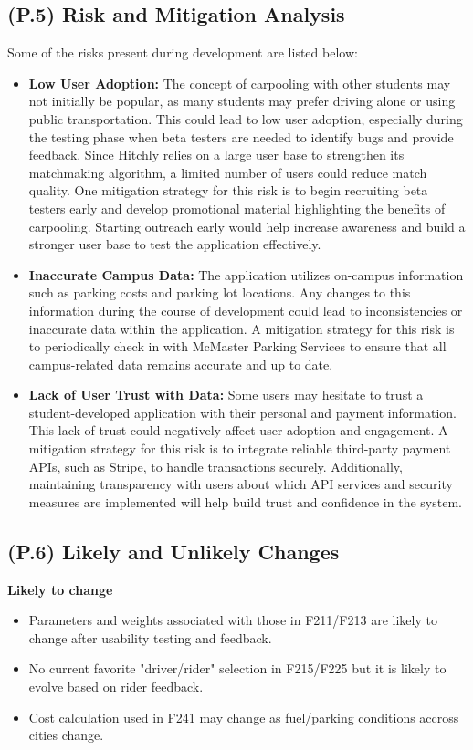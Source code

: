 \documentclass[12pt,letterpaper]{article}
\begin{document}
\subsection{(P.5) Risk and Mitigation Analysis}
Some of the risks present during development are listed below:

\begin{itemize}
    \item \textbf{Low User Adoption:} The concept of carpooling with other students may not initially be popular, as many students may prefer driving alone or using public transportation. This could lead to low user adoption, especially during the testing phase when beta testers are needed to identify bugs and provide feedback. Since Hitchly relies on a large user base to strengthen its matchmaking algorithm, a limited number of users could reduce match quality. One mitigation strategy for this risk is to begin recruiting beta testers early and develop promotional material highlighting the benefits of carpooling. Starting outreach early would help increase awareness and build a stronger user base to test the application effectively.

    \item \textbf{Inaccurate Campus Data:} The application utilizes on-campus information such as parking costs and parking lot locations. Any changes to this information during the course of development could lead to inconsistencies or inaccurate data within the application. A mitigation strategy for this risk is to periodically check in with McMaster Parking Services to ensure that all campus-related data remains accurate and up to date.

    \item \textbf{Lack of User Trust with Data:} Some users may hesitate to trust a student-developed application with their personal and payment information. This lack of trust could negatively affect user adoption and engagement. A mitigation strategy for this risk is to integrate reliable third-party payment APIs, such as Stripe, to handle transactions securely. Additionally, maintaining transparency with users about which API services and security measures are implemented will help build trust and confidence in the system.
\end{itemize}

\subsection{(P.6) Likely and Unlikely Changes}
\textbf{Likely to change}
\begin{itemize}
  \item Parameters and weights associated with those in F211/F213 are likely to change after usability testing and feedback.
  \item No current favorite "driver/rider" selection in F215/F225 but it is likely to evolve based on rider feedback.
  \item Cost calculation used in F241 may change as fuel/parking conditions accross cities change. 
\end{itemize}
\end{document}
